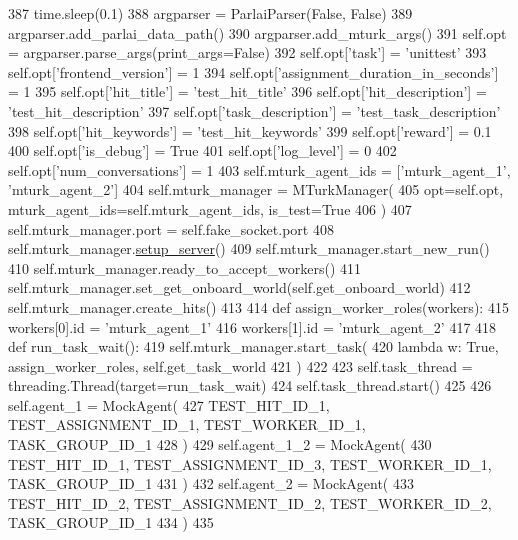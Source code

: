 \begin{DoxyCode}
387         time.sleep(0.1)
388         argparser = ParlaiParser(\textcolor{keyword}{False}, \textcolor{keyword}{False})
389         argparser.add\_parlai\_data\_path()
390         argparser.add\_mturk\_args()
391         self.opt = argparser.parse\_args(print\_args=\textcolor{keyword}{False})
392         self.opt[\textcolor{stringliteral}{'task'}] = \textcolor{stringliteral}{'unittest'}
393         self.opt[\textcolor{stringliteral}{'frontend\_version'}] = 1
394         self.opt[\textcolor{stringliteral}{'assignment\_duration\_in\_seconds'}] = 1
395         self.opt[\textcolor{stringliteral}{'hit\_title'}] = \textcolor{stringliteral}{'test\_hit\_title'}
396         self.opt[\textcolor{stringliteral}{'hit\_description'}] = \textcolor{stringliteral}{'test\_hit\_description'}
397         self.opt[\textcolor{stringliteral}{'task\_description'}] = \textcolor{stringliteral}{'test\_task\_description'}
398         self.opt[\textcolor{stringliteral}{'hit\_keywords'}] = \textcolor{stringliteral}{'test\_hit\_keywords'}
399         self.opt[\textcolor{stringliteral}{'reward'}] = 0.1
400         self.opt[\textcolor{stringliteral}{'is\_debug'}] = \textcolor{keyword}{True}
401         self.opt[\textcolor{stringliteral}{'log\_level'}] = 0
402         self.opt[\textcolor{stringliteral}{'num\_conversations'}] = 1
403         self.mturk\_agent\_ids = [\textcolor{stringliteral}{'mturk\_agent\_1'}, \textcolor{stringliteral}{'mturk\_agent\_2'}]
404         self.mturk\_manager = MTurkManager(
405             opt=self.opt, mturk\_agent\_ids=self.mturk\_agent\_ids, is\_test=\textcolor{keyword}{True}
406         )
407         self.mturk\_manager.port = self.fake\_socket.port
408         self.mturk\_manager.\hyperlink{namespaceparlai_1_1chat__service_1_1services_1_1messenger_1_1server__utils_afb56b04206cd0f42384438f1ac6d9cda}{setup\_server}()
409         self.mturk\_manager.start\_new\_run()
410         self.mturk\_manager.ready\_to\_accept\_workers()
411         self.mturk\_manager.set\_get\_onboard\_world(self.get\_onboard\_world)
412         self.mturk\_manager.create\_hits()
413 
414         \textcolor{keyword}{def }assign\_worker\_roles(workers):
415             workers[0].id = \textcolor{stringliteral}{'mturk\_agent\_1'}
416             workers[1].id = \textcolor{stringliteral}{'mturk\_agent\_2'}
417 
418         \textcolor{keyword}{def }run\_task\_wait():
419             self.mturk\_manager.start\_task(
420                 \textcolor{keyword}{lambda} w: \textcolor{keyword}{True}, assign\_worker\_roles, self.get\_task\_world
421             )
422 
423         self.task\_thread = threading.Thread(target=run\_task\_wait)
424         self.task\_thread.start()
425 
426         self.agent\_1 = MockAgent(
427             TEST\_HIT\_ID\_1, TEST\_ASSIGNMENT\_ID\_1, TEST\_WORKER\_ID\_1, TASK\_GROUP\_ID\_1
428         )
429         self.agent\_1\_2 = MockAgent(
430             TEST\_HIT\_ID\_1, TEST\_ASSIGNMENT\_ID\_3, TEST\_WORKER\_ID\_1, TASK\_GROUP\_ID\_1
431         )
432         self.agent\_2 = MockAgent(
433             TEST\_HIT\_ID\_2, TEST\_ASSIGNMENT\_ID\_2, TEST\_WORKER\_ID\_2, TASK\_GROUP\_ID\_1
434         )
435 
\end{DoxyCode}
